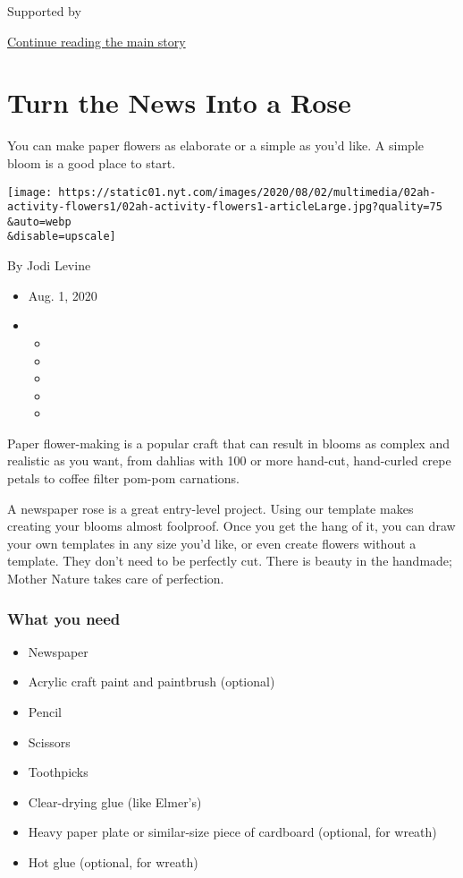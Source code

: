 Supported by

\protect\hyperlink{after-sponsor}{Continue reading the main story}

\hypertarget{turn-the-news-into-a-rose}{%
\section{Turn the News Into a Rose}\label{turn-the-news-into-a-rose}}

You can make paper flowers as elaborate or a simple as you'd like. A
simple bloom is a good place to start.

\texttt{[image: https://static01.nyt.com/images/2020/08/02/multimedia/02ah-activity-flowers1/02ah-activity-flowers1-articleLarge.jpg?quality=75\\\&auto=webp\\\&disable=upscale]}

By Jodi Levine

\begin{itemize}
\item
  Aug. 1, 2020
\item
  \begin{itemize}
  \item
  \item
  \item
  \item
  \item
  \end{itemize}
\end{itemize}

Paper flower-making is a popular craft that can result in blooms as
complex and realistic as you want, from dahlias with 100 or more
hand-cut, hand-curled crepe petals to coffee filter pom-pom carnations.

A newspaper rose is a great entry-level project. Using our template
makes creating your blooms almost foolproof. Once you get the hang of
it, you can draw your own templates in any size you'd like, or even
create flowers without a template. They don't need to be perfectly cut.
There is beauty in the handmade; Mother Nature takes care of perfection.

\hypertarget{what-you-need}{%
\subsubsection{What you need}\label{what-you-need}}

\begin{itemize}
\item
  Newspaper
\item
  Acrylic craft paint and paintbrush (optional)
\item
  Pencil
\item
  Scissors
\item
  Toothpicks
\item
  Clear-drying glue (like Elmer's)
\item
  Heavy paper plate or similar-size piece of cardboard (optional, for
  wreath)
\item
  Hot glue (optional, for wreath)
\end{itemize}

